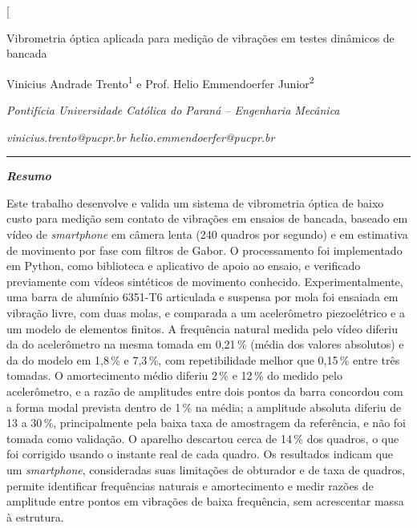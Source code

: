 \documentclass[a4paper,10pt,twocolumn]{article}
\begin{document}
\twocolumn[
  \begin{@twocolumnfalse}
  \begin{center}
    {\LARGE Vibrometria óptica aplicada para medição de vibrações
     em testes dinâmicos de bancada\par}
    \vspace{1em}
    {\large Vinicius Andrade Trento\textsuperscript{1} e
     Prof. Helio Emmendoerfer Junior\textsuperscript{2}\par}
    \vspace{0.6em}
    {\itshape Pontifícia Universidade Católica do Paraná -- Engenharia Mecânica\par}
    {\itshape vinicius.trento@pucpr.br \qquad helio.emmendoerfer@pucpr.br\par}
  \end{center}
  \vspace{0.5em}
  \hrule
  \vspace{0.8em}

  {\noindent\bfseries\itshape Resumo}
  \par\vspace{0.3em}
  {\small\justifying\noindent
  Este trabalho desenvolve e valida um sistema de vibrometria óptica de baixo custo para medição sem contato de vibrações em ensaios de bancada, baseado em vídeo de \textit{smartphone} em câmera lenta (240 quadros por segundo) e em estimativa de movimento por fase com filtros de Gabor. O processamento foi implementado em Python, como biblioteca e aplicativo de apoio ao ensaio, e verificado previamente com vídeos sintéticos de movimento conhecido. Experimentalmente, uma barra de alumínio 6351-T6 articulada e suspensa por mola foi ensaiada em vibração livre, com duas molas, e comparada a um acelerômetro piezoelétrico e a um modelo de elementos finitos. A frequência natural medida pelo vídeo diferiu da do acelerômetro na mesma tomada em 0,21\,\% (média dos valores absolutos) e da do modelo em 1,8\,\% e 7,3\,\%, com repetibilidade melhor que 0,15\,\% entre três tomadas. O amortecimento médio diferiu 2\,\% e 12\,\% do medido pelo acelerômetro, e a razão de amplitudes entre dois pontos da barra concordou com a forma modal prevista dentro de 1\,\% na média; a amplitude absoluta diferiu de 13 a 30\,\%, principalmente pela baixa taxa de amostragem da referência, e não foi tomada como validação. O aparelho descartou cerca de 14\,\% dos quadros, o que foi corrigido usando o instante real de cada quadro. Os resultados indicam que um \textit{smartphone}, consideradas suas limitações de obturador e de taxa de quadros, permite identificar frequências naturais e amortecimento e medir razões de amplitude entre pontos em vibrações de baixa frequência, sem acrescentar massa à estrutura.\par}



\end{@twocolumnfalse}
\end{document}
